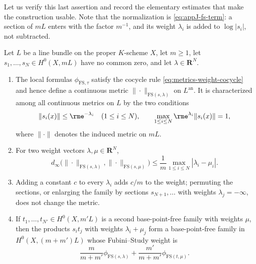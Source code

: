 Let us verify this last assertion and record the elementary estimates that
make the construction usable. Note that the normalization is
\eqref{eq:appJ-fs-term}: a section of $mL$ enters with the factor
$m^{-1}$, and its weight $\lambda_i$ is added to $\log|s_i|$, not
subtracted.

\begin{proposition}
\label{prop:metrics-fs-basic}
Let $L$ be a line bundle on the proper $K$-scheme $X$, let
$m\ge1$, let $s_1,\ldots,s_N\in H^0(X,mL)$ have no common zero, and let
$\lambda\in\mathbf R^N$.
\begin{enumerate}
\item The local formulas $\phi_{\mathrm{FS},\tau}$ satisfy the cocycle
rule \eqref{eq:metrics-weight-cocycle} and hence define a continuous metric
$\|\cdot\|_{\mathrm{FS}(s,\lambda)}$ on $L^{\mathrm{an}}$. It is
characterized among all continuous metrics on $L$ by the two conditions
\begin{equation}
\label{eq:metrics-fs-characterization}
 \|s_i(x)\|\le\rme^{-\lambda_i}\quad(1\le i\le N),
 \qquad
 \max_{1\le i\le N}\rme^{\lambda_i}\|s_i(x)\|=1,
\end{equation}
where $\|\cdot\|$ denotes the induced metric on $mL$.
\item For two weight vectors $\lambda,\mu\in\mathbf R^N$,
\[
 d_\infty\bigl(\|\cdot\|_{\mathrm{FS}(s,\lambda)},
 \|\cdot\|_{\mathrm{FS}(s,\mu)}\bigr)
 \le\frac1m\max_{1\le i\le N}|\lambda_i-\mu_i| .
\]
\item Adding a constant $c$ to every $\lambda_i$ adds $c/m$ to the
weight; permuting the sections, or enlarging the family by sections
$s_{N+1},\ldots$ with weights $\lambda_j=-\infty$, does not change the
metric.
\item If $t_1,\ldots,t_{N'}\in H^0(X,m'L)$ is a second base-point-free
family with weights $\mu$, then the products $s_it_j$ with weights
$\lambda_i+\mu_j$ form a base-point-free family in $H^0(X,(m+m')L)$
whose Fubini--Study weight is
\[
 \frac{m}{m+m'}\phi_{\mathrm{FS}(s,\lambda)}
 +\frac{m'}{m+m'}\phi_{\mathrm{FS}(t,\mu)}.
\]
\end{enumerate}
\end{proposition}

